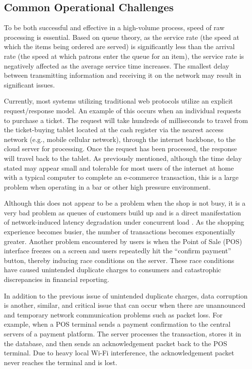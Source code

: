 \subsection{Common Operational Challenges}
To be both successful and effective in a high-volume process, speed of raw processing is essential. Based on queue theory, as the service rate (the speed at which the items being ordered are served) is significantly less than the arrival rate (the speed at which patrons enter the queue for an item), the service rate is negatively affected as the average service time increases. The smallest delay between transmitting information and receiving it on the network may result in significant issues.

Currently, most systems utilizing traditional web protocols utilize an explicit request/response model. An example of this occurs when an individual requests to purchase a ticket. The request will take hundreds of milliseconds to travel from the ticket-buying tablet located at the cash register via the nearest access network (e.g., mobile cellular network), through the internet backbone, to the cloud server for processing. Once the request has been processed, the response will travel back to the tablet. As previously mentioned, although the time delay stated may appear small and tolerable for most users of the internet at home with a typical computer to complete an e-commerce transaction, this is a large problem when operating in a bar or other high pressure environment.

Although this does not appear to be a problem when the shop is not busy, it is a very bad problem as queues of customers build up and is a direct manifestation of network-induced latency degradation under concurrent load \cite{ibm2019cloud}. As the shopping experience becomes busier, the number of transactions becomes exponentially greater. Another problem encountered by users is when the Point of Sale (POS) interface freezes on a screen and users repeatedly hit the ``confirm payment'' button, thereby inducing race conditions on the server. These race conditions have caused unintended duplicate charges to consumers and catastrophic discrepancies in financial reporting. 

In addition to the previous issue of unintended duplicate charges, data corruption is another, similar, and critical issue that can occur when there are unannounced and temporary network communication problems such as packet loss. For example, when a POS terminal sends a payment confirmation to the central servers of a payment platform. The server processes the transaction, stores it in the database, and then sends an acknowledgement packet back to the POS terminal. Due to heavy local Wi-Fi interference, the acknowledgement packet never reaches the terminal and is lost. 

